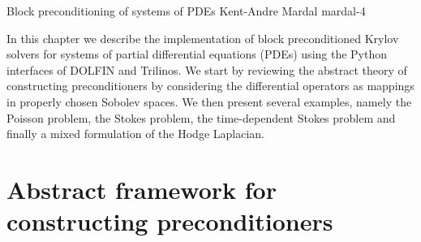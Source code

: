               {Block preconditioning of systems of PDEs}
              {Kent-Andre Mardal}
              {mardal-4}

In this chapter we describe the implementation of block preconditioned
Krylov solvers for systems of partial differential equations (PDEs)
using the Python interfaces of DOLFIN and Trilinos.
We start by reviewing the abstract theory of constructing
preconditioners by considering the differential
operators as mappings in properly chosen Sobolev spaces. We then
present several examples, namely the Poisson problem, the Stokes
problem, the time-dependent Stokes problem and finally a mixed
formulation of the Hodge Laplacian.

\section{Abstract framework for constructing preconditioners}

